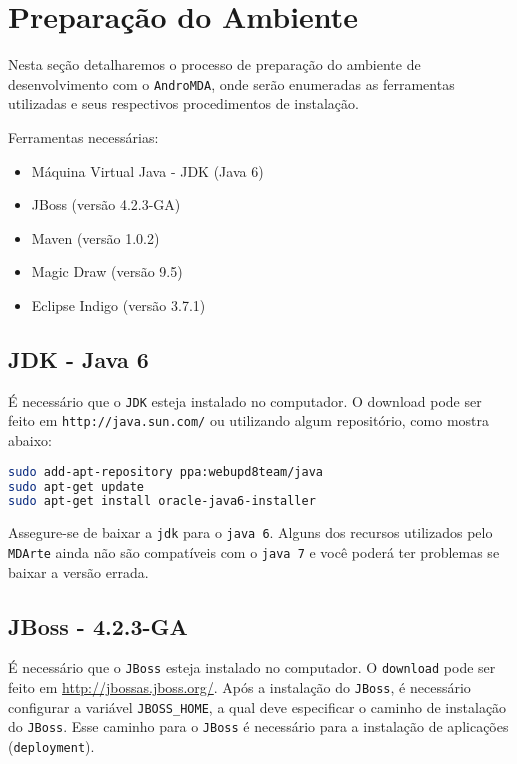 \chapter{Preparação do Ambiente}

Nesta seção detalharemos o processo de preparação do ambiente de desenvolvimento
com o \texttt{AndroMDA}, onde serão enumeradas as ferramentas utilizadas e seus
respectivos procedimentos de instalação.

Ferramentas necessárias:
\begin{itemize}
  \item Máquina Virtual Java - JDK (Java 6)
  \item JBoss (versão 4.2.3-GA)
  \item Maven (versão 1.0.2) 
  \item Magic Draw (versão 9.5)
  \item Eclipse Indigo (versão 3.7.1)
\end{itemize}

\section{JDK - Java 6}

É necessário que o \texttt{JDK} esteja instalado no computador. O
download pode ser feito em \texttt{http://java.sun.com/} ou utilizando
algum repositório, como mostra abaixo:

\begin{lstlisting}[language=bash]
sudo add-apt-repository ppa:webupd8team/java
sudo apt-get update
sudo apt-get install oracle-java6-installer
\end{lstlisting}

Assegure-se de baixar a \texttt{jdk} para o \texttt{java 6}. Alguns dos recursos
utilizados pelo \texttt{MDArte} ainda não são compatíveis com o \texttt{java 7}
e você poderá ter problemas se baixar a versão errada.

\section{JBoss - 4.2.3-GA}

É necessário que o \texttt{JBoss} esteja instalado no computador. O
\texttt{download} pode ser feito em
\href{http://jbossas.jboss.org/}{http://jbossas.jboss.org/}. Após a
instalação do \texttt{JBoss}, é necessário configurar a variável
\texttt{JBOSS\_HOME}, a qual deve especificar o caminho de instalação do
\texttt{JBoss}. Esse caminho para o \texttt{JBoss} é necessário para a
instalação de aplicações (\texttt{deployment}).

